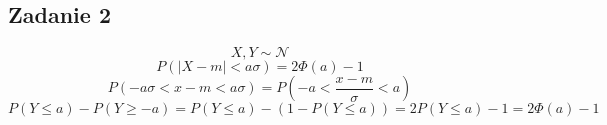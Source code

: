 \subsection{Zadanie 2}

\begin{equation*}
X,Y\sim{\mathcal{N}}
\end{equation*}
\begin{equation*}
P(|X-m|<a\sigma)=2\Phi{(a)}-1
\end{equation*}
\begin{equation*}
P(-a\sigma<x-m<a\sigma)=P(-a<\frac{x-m}{\sigma}<a)
\end{equation*}
\begin{equation*}
P(Y\leq{a})-P(Y\geq{-a})=P(Y\leq{a})-(1-P(Y\leq{a}))=2P(Y\leq{a})-1=2\Phi{(a)}-1
\end{equation*}
